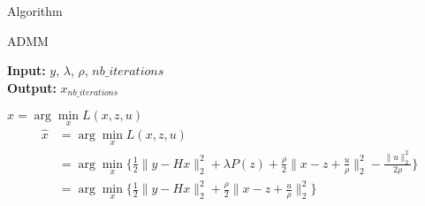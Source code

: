 \begin{frame}{Algorithm}

\begin{algorithm}[H]
    \caption{ADMM} %
    \begin{algorithmic}[1]
        \newline
        \textbf{Input:} $y$, $\lambda$, $\rho$, $nb\_iterations$ \\
        \textbf{Output:} $x_{nb\_iterations}$
        \EndFor
        \EndProcedure
    \end{algorithmic}
\end{algorithm}
\end{frame}

\begin{frame}{$\hat x = \arg\min\limits_{x} {L(x, z, u)}$}
    \begin{align*}
        \hat x
        &= \arg\min\limits_{x} L(x, z, u) \\
        &= \arg\min\limits_{x} \{
            \frac{1}{2} \lVert y - Hx \rVert_{2}^{2} + \lambda P(z) +
            \frac{\rho}{2} \lVert x-z+\frac{u}{\rho} \rVert_{2}^{2} 
            - \frac{\lVert u \rVert_{2}^{2}}{2\rho}
        \} \\
        &= \arg\min\limits_{x} \{
            \frac{1}{2} \lVert y - Hx \rVert_{2}^{2} +
            \frac{\rho}{2} \lVert x-z+\frac{u}{\rho} \rVert_{2}^{2}
        \} \\
    \end{align*}
\end{frame}


